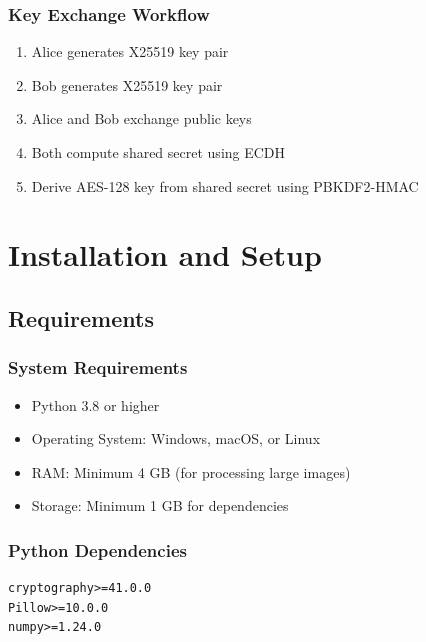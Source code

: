 \documentclass[12pt,a4paper]{report}
\begin{document}
\subsection{Key Exchange Workflow}

\begin{enumerate}
    \item Alice generates X25519 key pair
    \item Bob generates X25519 key pair
    \item Alice and Bob exchange public keys
    \item Both compute shared secret using ECDH
    \item Derive AES-128 key from shared secret using PBKDF2-HMAC
\end{enumerate}

\chapter{Installation and Setup}

\section{Requirements}

\subsection{System Requirements}
\begin{itemize}
    \item Python 3.8 or higher
    \item Operating System: Windows, macOS, or Linux
    \item RAM: Minimum 4 GB (for processing large images)
    \item Storage: Minimum 1 GB for dependencies
\end{itemize}

\subsection{Python Dependencies}

\begin{lstlisting}[caption=requirements.txt]
cryptography>=41.0.0
Pillow>=10.0.0
numpy>=1.24.0
\end{lstlisting}
\end{document}
